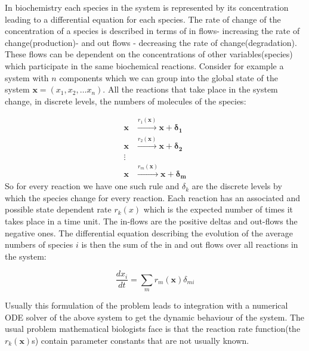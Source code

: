 In biochemistry each species in the system is represented by its 
concentration leading to a differential equation for each species. The
rate of change of the concentration of a species is described in terms
of in flows- increasing the rate of change(production)- and out flows
- decreasing the rate of change(degradation). These flows can be
dependent on the concentrations of other variables(species) which
participate in the same biochemical reactions. Consider for example a
system with $n$ components which we can group into the global state of
the system $\mathbf{x} = (x_1, x_2, \dots x_n)$. All the reactions
that take place in the system change, in discrete levels, the numbers
of molecules of the species:

\begin{align*}
\mathbf{x} &\overset{r_1(\mathbf{x})}{\longrightarrow} \mathbf{x} +
\mathbf{\delta_1}\\
\mathbf{x} &\overset{r_2(\mathbf{x})}{\longrightarrow} \mathbf{x} +
\mathbf{\delta_2}\\
\vdots \\
\mathbf{x} &\overset{r_m(\mathbf{x})}{\longrightarrow} \mathbf{x} +
\mathbf{\delta_m}
\end{align*}
So for every reaction we have one such rule and $\delta_k$ are the
discrete levels by which the species change for every reaction. Each
reaction has an associated and possible state dependent rate $r_k(x)$
which is the expected number of times it takes place in a time
unit. The in-flows are the positive deltas and out-flows the negative
ones. The differential equation describing the evolution of the average numbers
of  species $i$ is then the sum of the in
and out flows over all reactions in the system:

\begin{equation*}
\frac{dx_i}{dt} = \sum_{m} r_m(\mathbf{x})\delta_{mi}
\end{equation*}

Usually this formulation of the problem leads to integration with a
numerical ODE solver of the above system to get the dynamic behaviour
of the system. The usual problem mathematical biologists face is that
the reaction rate function(the $r_k(\mathbf{x})$s) contain parameter
constants that are not usually known. 

